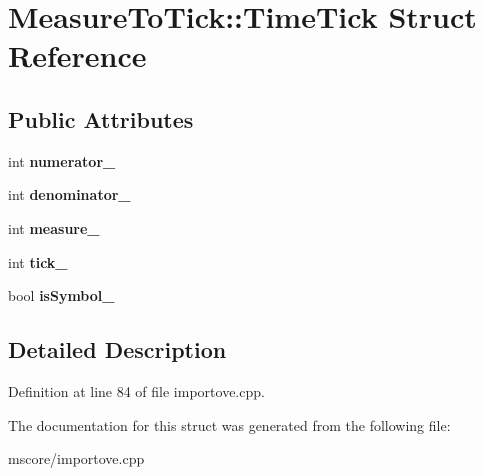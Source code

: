 \hypertarget{struct_measure_to_tick_1_1_time_tick}{}\section{Measure\+To\+Tick\+:\+:Time\+Tick Struct Reference}
\label{struct_measure_to_tick_1_1_time_tick}
\subsection*{Public Attributes}
\begin{DoxyCompactItemize}
\item 
\mbox{\label{struct_measure_to_tick_1_1_time_tick_a07cfa1b6f4cc2b27717aeee89f170cb6}} 
int {\bfseries numerator\+\_\+}
\item 
\mbox{\label{struct_measure_to_tick_1_1_time_tick_a17ccde8ee969ea1f55e04ead1f91d696}} 
int {\bfseries denominator\+\_\+}
\item 
\mbox{\label{struct_measure_to_tick_1_1_time_tick_a146fa7187ce44fcf3f4c86e8dea4ec86}} 
int {\bfseries measure\+\_\+}
\item 
\mbox{\label{struct_measure_to_tick_1_1_time_tick_a9840447a9ef82fd1a4df8ac879299c15}} 
int {\bfseries tick\+\_\+}
\item 
\mbox{\label{struct_measure_to_tick_1_1_time_tick_a12b6ef09a09f3dc038e4f367c0aecc5c}} 
bool {\bfseries is\+Symbol\+\_\+}
\end{DoxyCompactItemize}


\subsection{Detailed Description}


Definition at line 84 of file importove.\+cpp.



The documentation for this struct was generated from the following file\+:\begin{DoxyCompactItemize}
\item 
mscore/importove.\+cpp\end{DoxyCompactItemize}
